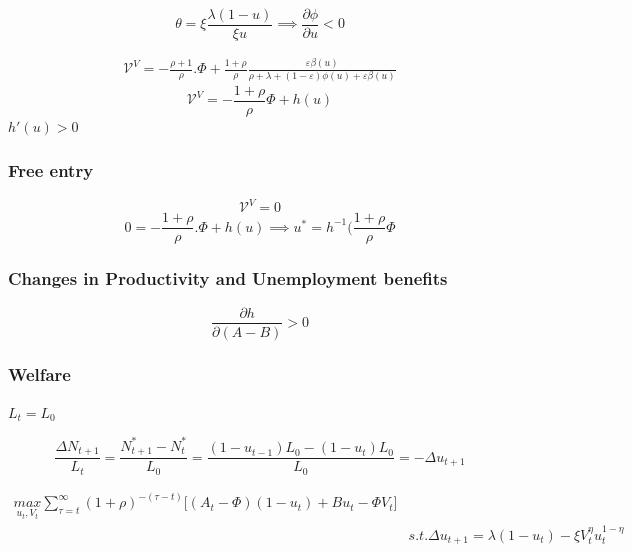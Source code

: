\begin{equation*}
    \theta=\xi\frac{\lambda(1-u)}{\xi u} \implies \frac{\partial \phi}{\partial u}<0
\end{equation*}

\begin{equation*}
    \begin{aligned}
        \mathcal{V}^{V}=-\frac{\rho+1}{\rho}.\Phi+\frac{1+\rho}{\rho}\frac{\varepsilon\beta(u)}{\rho+\lambda+(1-\varepsilon)\phi(u)+\varepsilon\beta(u)}
    \end{aligned}
\end{equation*}
\begin{equation*}
     \mathcal{V}^{V}=-\frac{1+\rho}{\rho}\Phi+h(u)
\end{equation*}
$h'(u)>0$

\subsubsection{Free entry}
\begin{equation*}
    \mathcal{V}^{V}=0
\end{equation*}
\begin{equation*}
    0=-\frac{1+\rho}{\rho}.\Phi+h(u) \implies u^{*}=h^{-1}\big(\frac{1+\rho}{\rho}\Phi
\end{equation*}

\subsubsection{Changes in Productivity and Unemployment benefits}
\begin{equation*}
    \frac{\partial h}{\partial(A-B)}>0
\end{equation*}

\subsubsection{Welfare}
$L_{t}=L_{0}$

\begin{equation*}
    \frac{\Delta N_{t+1}}{L_{t}}=\frac{N_{t+1}^{*}-N_{t}^{*}}{L_{0}}=\frac{(1-u_{t-1})L_{0}-(1-u_{t})L_{0}}{L_{0}}=-\Delta u_{t+1}
\end{equation*}

\begin{equation*}
    \begin{aligned}
        \underset{u_{t},V_{t}}{max}\sum_{\tau=t}^{\infty}(1+\rho)^{-(\tau-t)}\bigg[(A_{t}-\Phi)(1-u_{t})+Bu_{t}-\Phi V_{t} \bigg] \\
    &   s.t. \Delta u_{t+1}=\lambda (1-u_{t}) - \xi V_{t}^{\eta}u_{t}^{1-\eta}
    \end{aligned}
\end{equation*}

